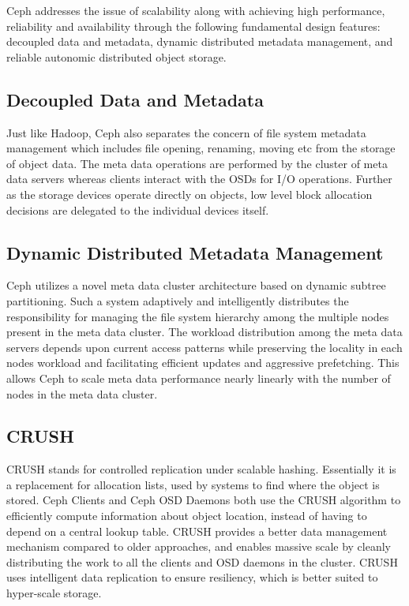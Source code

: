 \documentclass[a4paper,10pt]{article}
\begin{document}
Ceph  addresses the issue of scalability along with achieving high performance, reliability and availability through the following fundamental design features: decoupled data and metadata, dynamic distributed metadata management, and reliable autonomic distributed object storage. 

\begin{adjustwidth}{1.5em}{0pt}
\subsection{Decoupled Data and Metadata}
Just like Hadoop, Ceph also separates the concern of file system metadata management which includes file opening, renaming, moving etc from the storage of object data. The meta data operations are performed by the cluster of meta data servers whereas clients interact with the OSDs for I/O operations. Further as the storage devices operate directly on objects, low level block allocation decisions are delegated to the individual devices itself.
\end{adjustwidth}

\begin{adjustwidth}{1.5em}{0pt}
\subsection{Dynamic Distributed Metadata Management}
Ceph utilizes a novel meta data cluster architecture based on dynamic subtree partitioning\cite{weil2004dynamic}. Such a system adaptively and intelligently distributes the responsibility for managing the file system hierarchy among the multiple nodes present in the meta data cluster. The workload distribution among the meta data servers depends upon current access patterns while preserving the locality in each nodes workload and facilitating efficient updates and aggressive prefetching. This allows Ceph to scale meta data performance nearly linearly with the number of nodes in the meta data cluster.

\end{adjustwidth}

\begin{adjustwidth}{1.5em}{0pt}
\subsection{CRUSH}
    CRUSH stands for controlled replication under scalable hashing. Essentially it is a replacement for allocation lists, used by systems to find where the object is stored. Ceph Clients and Ceph OSD Daemons both use the CRUSH\cite{crush} algorithm to efficiently compute information about object location, instead of having to depend on a central lookup table. CRUSH provides a better data management mechanism compared to older approaches, and enables massive scale by cleanly distributing the work to all the clients and OSD daemons in the cluster. CRUSH uses intelligent data replication to ensure resiliency, which is better suited to hyper-scale storage. 
\end{adjustwidth}
\end{document}
